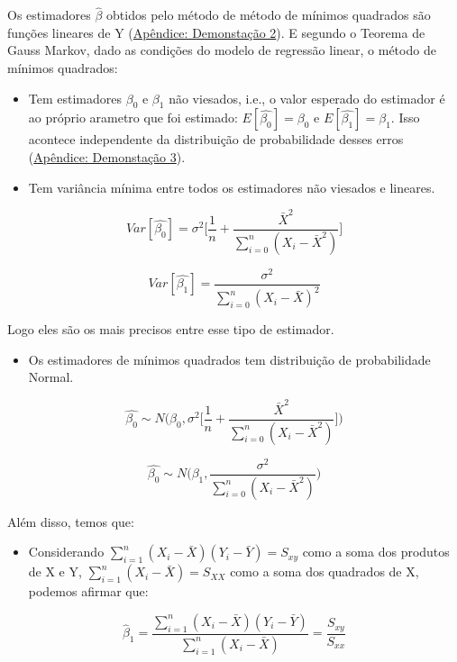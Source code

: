 \documentclass[
]{article}
\providecommand{\tightlist}{%
  \setlength{\itemsep}{0pt}\setlength{\parskip}{0pt}}
\begin{document}
Os estimadores \(\hat{\beta}\) obtidos pelo método de método de mínimos
quadrados são funções lineares de Y
(\href{https://larissars.github.io/Apostilas-estatistica/apendice.html\#Demonstração_2}{Apêndice:
Demonstação 2}). E segundo o Teorema de Gauss Markov, dado as condições
do modelo de regressão linear, o método de mínimos quadrados:

\begin{itemize}
\item
  Tem estimadores \(\beta_0\) e \(\beta_1\) não viesados, i.e., o valor
  esperado do estimador é ao próprio arametro que foi estimado:
  \(E[\hat{\beta_0}]= \beta_0\) e \(E[\hat{\beta_1}]= \beta_1\). Isso
  acontece independente da distribuição de probabilidade desses erros
  (\href{https://larissars.github.io/Apostilas-estatistica/apendice.html\#Demonstração_3}{Apêndice:
  Demonstação 3}).
\item
  Tem variância mínima entre todos os estimadores não viesados e
  lineares.
\end{itemize}

\[Var[\hat{\beta_0}]=\sigma^2\Bigg[\frac{1}{n}+\frac{\bar{X}^2}{\sum_{i=0}^{n}(X_i-\bar{X}^2)}\Bigg]\]

\[Var[\hat{\beta_1}]=\frac{\sigma^2}{\sum_{i=0}^{n}(X_i-\bar{X})^2}\]

Logo eles são os mais precisos entre esse tipo de estimador.

\begin{itemize}
\tightlist
\item
  Os estimadores de mínimos quadrados tem distribuição de probabilidade
  Normal.
\end{itemize}

\[\hat{\beta_0} \sim N\Bigg(\beta_0, \sigma^2\Bigg[\frac{1}{n}+\frac{\bar{X}^2}{\sum_{i=0}^{n}(X_i-\bar{X}^2)}\Bigg]\Bigg)\]

\[\hat{\beta_0} \sim N\Bigg(\beta_1,\frac{\sigma^2}{\sum_{i=0}^{n}(X_i-\bar{X}^2)} \Bigg)\]

Além disso, temos que:

\begin{itemize}
\tightlist
\item
  Considerando \(\sum_{i=1}^{n}(X_i-\bar{X})(Y_i-\bar{Y})=S_{xy}\) como
  a soma dos produtos de X e Y, \(\sum_{i=1}^{n}(X_i-\bar{X})=S_{XX}\)
  como a soma dos quadrados de X, podemos afirmar que:
\end{itemize}

\[\hat{\beta}_1 = \frac{\sum_{i=1}^{n}(X_i-\bar{X})(Y_i-\bar{Y})}{\sum_{i=1}^{n}(X_i-\bar{X})}=\frac{S_{xy}}{S_{xx}}\]
\end{document}

